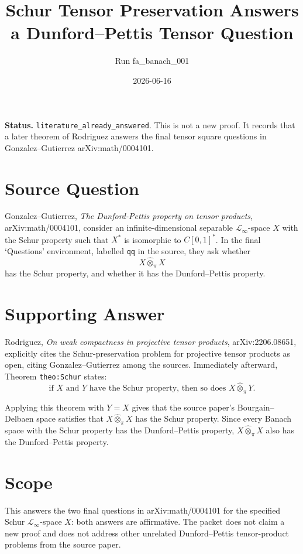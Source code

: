 \documentclass[11pt]{amsart}
\begin{document}
\title{Schur Tensor Preservation Answers a Dunford--Pettis Tensor Question}
\author{Run fa\_banach\_001}
\date{2026-06-16}
\maketitle

\noindent
\textbf{Status.} \texttt{literature\_already\_answered}. This is not a new
proof. It records that a later theorem of Rodriguez answers the final tensor
square questions in Gonzalez--Gutierrez arXiv:math/0004101.

\section*{Source Question}

Gonzalez--Gutierrez, \emph{The Dunford-Pettis property on tensor products},
arXiv:math/0004101, consider an infinite-dimensional separable
\(\mathscr L_\infty\)-space \(X\) with the Schur property such that
\(X^*\) is isomorphic to \(C[0,1]^*\). In the final `Questions' environment,
labelled \texttt{qq} in the source, they ask whether
\[
  X\widehat\otimes_\pi X
\]
has the Schur property, and whether it has the Dunford--Pettis property.

\section*{Supporting Answer}

Rodriguez, \emph{On weak compactness in projective tensor products},
arXiv:2206.08651, explicitly cites the Schur-preservation problem for
projective tensor products as open, citing Gonzalez--Gutierrez among the
sources. Immediately afterward, Theorem \texttt{theo:Schur} states:
\[
  \text{if } X \text{ and } Y \text{ have the Schur property, then so does }
  X\widehat\otimes_\pi Y.
\]

Applying this theorem with \(Y=X\) gives that the source paper's
Bourgain--Delbaen space satisfies that \(X\widehat\otimes_\pi X\) has the
Schur property. Since every Banach space with the Schur property has the
Dunford--Pettis property, \(X\widehat\otimes_\pi X\) also has the
Dunford--Pettis property.

\section*{Scope}

This answers the two final questions in arXiv:math/0004101 for the specified
Schur \(\mathscr L_\infty\)-space \(X\): both answers are affirmative. The
packet does not claim a new proof and does not address other unrelated
Dunford--Pettis tensor-product problems from the source paper.
\end{document}
